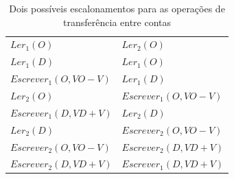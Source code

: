 \documentclass[11pt,twoside,a4paper]{book}
\begin{document}



\begin{table}
\caption{Dois possíveis escalonamentos para as operações de transferência entre contas}
\label{tab:exemplo_escalonamento}
\centering
\begin{tabular}{ | l | l | }
	\hline
	$Ler_1(O)$&$Ler_2(O)$\\
	$Ler_1(D)$&$Ler_1(O)$\\
	$Escrever_1(O, VO - V)$&$Ler_1(D)$\\
	$Ler_2(O)$&$Escrever_1(O, VO - V)$\\
	$Escrever_1(D, VD + V)$&$Ler_2(D)$\\
	$Ler_2(D)$&$Escrever_2(O, VO - V)$\\
	$Escrever_2(O, VO - V)$&$Escrever_2(D, VD + V)$\\
	$Escrever_2(D, VD + V)$&$Escrever_1(D, VD + V)$\\
	\hline
\end{tabular}
\end{table}
\end{document}
